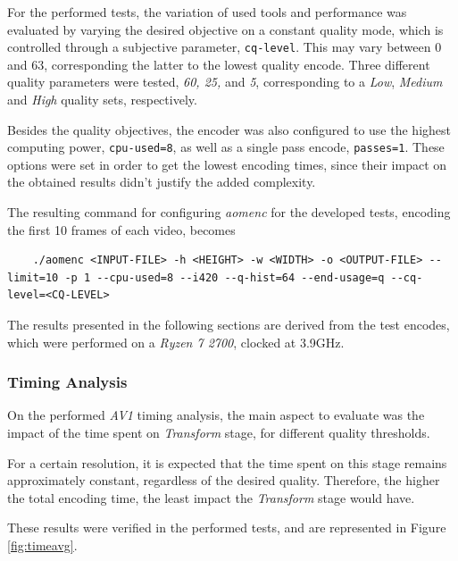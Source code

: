 For the performed tests, the variation of used tools and performance was evaluated by varying the desired objective on a constant quality mode, which is controlled through a subjective parameter, \texttt{cq-level}. This may vary between 0 and 63, corresponding the latter to the lowest quality encode. Three different quality parameters were tested, \emph{60, 25,} and \emph{5}, corresponding to a \emph{Low}, \emph{Medium} and \emph{High} quality sets, respectively.

Besides the quality objectives, the encoder was also configured to use the highest computing power, \texttt{cpu-used=8}, as well as a single pass encode, \texttt{passes=1}. These options were set in order to get the lowest encoding times, since their impact on the obtained results didn't justify the added complexity.

The resulting command for configuring \emph{aomenc} for the developed tests, encoding the first 10 frames of each video, becomes

\begin{lstlisting}
    ./aomenc <INPUT-FILE> -h <HEIGHT> -w <WIDTH> -o <OUTPUT-FILE> --limit=10 -p 1 --cpu-used=8 --i420 --q-hist=64 --end-usage=q --cq-level=<CQ-LEVEL>
\end{lstlisting}

The results presented in the following sections are derived from the test encodes, which were performed on a \emph{Ryzen 7 2700}, clocked at 3.9GHz.

\subsubsection{Timing Analysis} \label{sec:timinganal}

On the performed \emph{AV1} timing analysis, the main aspect to evaluate was the impact of the time spent on \emph{Transform} stage, for different quality thresholds.

For a certain resolution, it is expected that the time spent on this stage remains approximately constant, regardless of the desired quality. Therefore, the higher the total encoding time, the least impact the \emph{Transform} stage would have.

These results were verified in the performed tests, and are represented in Figure \ref{fig:timeavg}.

